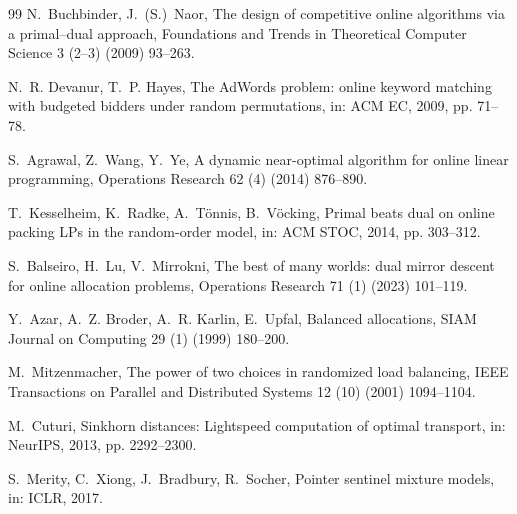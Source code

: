 \documentclass[preprint,12pt]{elsarticle}
\theoremstyle{plain}
\theoremstyle{remark}
\begin{document}
\begin{thebibliography}{99}
 N.~Buchbinder, J.~(S.)~Naor, The design of competitive
online algorithms via a primal--dual approach, Foundations and Trends in
Theoretical Computer Science 3 (2--3) (2009) 93--263.

 N.~R. Devanur, T.~P. Hayes, The AdWords problem:
online keyword matching with budgeted bidders under random permutations,
in: ACM EC, 2009, pp. 71--78.

 S.~Agrawal, Z.~Wang, Y.~Ye, A dynamic near-optimal algorithm
for online linear programming, Operations Research 62 (4) (2014) 876--890.

 T.~Kesselheim, K.~Radke, A.~T\"onnis, B.~V\"ocking, Primal
beats dual on online packing LPs in the random-order model, in: ACM STOC,
2014, pp. 303--312.

 S.~Balseiro, H.~Lu, V.~Mirrokni, The best of many worlds:
dual mirror descent for online allocation problems, Operations Research
71 (1) (2023) 101--119.

 Y.~Azar, A.~Z. Broder, A.~R. Karlin, E.~Upfal,
Balanced allocations, SIAM Journal on Computing 29 (1) (1999) 180--200.

 M.~Mitzenmacher, The power of two choices in
randomized load balancing, IEEE Transactions on Parallel and Distributed
Systems 12 (10) (2001) 1094--1104.

 M.~Cuturi, Sinkhorn distances: Lightspeed computation of
optimal transport, in: NeurIPS, 2013, pp. 2292--2300.

 S.~Merity, C.~Xiong, J.~Bradbury, R.~Socher, Pointer
sentinel mixture models, in: ICLR, 2017.

\end{thebibliography}
\end{document}
